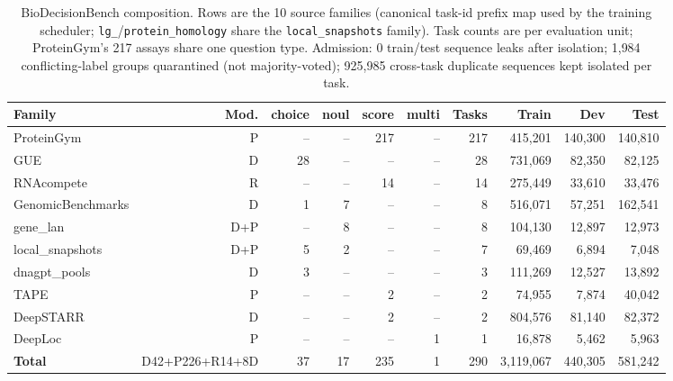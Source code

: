 \begin{table}[t]
\centering
\caption{BioDecisionBench composition. Rows are the 10 source families (canonical
task-id prefix map used by the training scheduler; \texttt{lg\_}/\texttt{protein\_homology} share the
\texttt{local\_snapshots} family). Task counts are per evaluation unit; ProteinGym's 217 assays
share one question type. Admission: 0 train/test sequence leaks after isolation;
1{,}984 conflicting-label groups quarantined (not majority-voted);
925{,}985 cross-task duplicate sequences kept isolated per task.}
\label{tab:benchmark}
\small
\begin{tabular}{lrrrrrrrrr}
\toprule
Family & Mod. & choice & noul & score & multi & Tasks & Train & Dev & Test
\\ \midrule
ProteinGym & P & -- & -- & 217 & -- & 217 & 415,201 & 140,300 & 140,810 \\
GUE & D & 28 & -- & -- & -- & 28 & 731,069 & 82,350 & 82,125 \\
RNAcompete & R & -- & -- & 14 & -- & 14 & 275,449 & 33,610 & 33,476 \\
GenomicBenchmarks & D & 1 & 7 & -- & -- & 8 & 516,071 & 57,251 & 162,541 \\
gene\_lan & D+P & -- & 8 & -- & -- & 8 & 104,130 & 12,897 & 12,973 \\
local\_snapshots & D+P & 5 & 2 & -- & -- & 7 & 69,469 & 6,894 & 7,048 \\
dnagpt\_pools & D & 3 & -- & -- & -- & 3 & 111,269 & 12,527 & 13,892 \\
TAPE & P & -- & -- & 2 & -- & 2 & 74,955 & 7,874 & 40,042 \\
DeepSTARR & D & -- & -- & 2 & -- & 2 & 804,576 & 81,140 & 82,372 \\
DeepLoc & P & -- & -- & -- & 1 & 1 & 16,878 & 5,462 & 5,963 \\
\midrule
\textbf{Total} & D42+P226+R14+8D & 37 & 17 & 235 & 1 & 290 & 3,119,067 & 440,305 & 581,242 \\
\bottomrule
\end{tabular}
\end{table}
